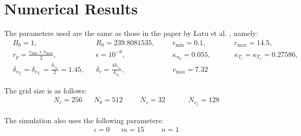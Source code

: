 \section{Numerical Results}

The parameters used are the same as those in the paper by Latu et al. \cite{YamanPaper}, namely:
\begin{align*}
 & B_0=1, && R_0 = 239.8081535, &&& r_{\min}=0.1, &&&& r_{\max}=14.5,\\
 & r_p = \frac{r_{\min}+r_{\max}}{2}, && \epsilon = 10^{-6}, &&& \kappa_{n_0}=0.055, &&&& \kappa_{T_i}=\kappa_{T_e}=0.27586,\\
 & \delta_{r_{T_i}}=\delta_{r_{T_e}}=\frac{\delta_{r_{n_0}}}{2} = 1.45, && \delta_r = \frac{4\delta_{r_{n_0}}}{\delta_{r_{T_i}}}, &&& v_{\max}=7.32 
\end{align*}

The grid size is as follows:
\begin{align*}
 & N_r = 256 && N_\theta = 512 &&& N_z = 32 &&&& N_{v_\parallel} = 128
\end{align*}

The simulation also uses the following parameters:
\begin{align*}
 &\iota=0 && m=15 &&& n=1
\end{align*}


